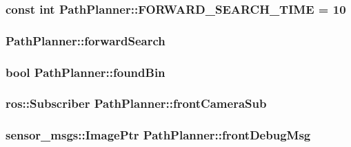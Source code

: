 \subsubsection[{\texorpdfstring{F\+O\+R\+W\+A\+R\+D\+\_\+\+S\+E\+A\+R\+C\+H\+\_\+\+T\+I\+ME}{FORWARD_SEARCH_TIME}}]{\setlength{\rightskip}{0pt plus 5cm}const int Path\+Planner\+::\+F\+O\+R\+W\+A\+R\+D\+\_\+\+S\+E\+A\+R\+C\+H\+\_\+\+T\+I\+ME = 10}\hypertarget{classPathPlanner_a12b219c458ee64a02f3255f76ad63be6}{}\label{classPathPlanner_a12b219c458ee64a02f3255f76ad63be6}
\subsubsection[{\texorpdfstring{forward\+Search}{forwardSearch}}]{ Path\+Planner\+::forward\+Search}\hypertarget{classPathPlanner_a2164113fa9ab422003bffad0454f5bb0}{}\label{classPathPlanner_a2164113fa9ab422003bffad0454f5bb0}
\subsubsection[{\texorpdfstring{found\+Bin}{foundBin}}]{\setlength{\rightskip}{0pt plus 5cm}bool Path\+Planner\+::found\+Bin}\hypertarget{classPathPlanner_ac649564f82726f564a0e4b1446886c5d}{}\label{classPathPlanner_ac649564f82726f564a0e4b1446886c5d}
\subsubsection[{\texorpdfstring{front\+Camera\+Sub}{frontCameraSub}}]{\setlength{\rightskip}{0pt plus 5cm}ros\+::\+Subscriber Path\+Planner\+::front\+Camera\+Sub}\hypertarget{classPathPlanner_ae5bf7f525a1723eef45c2887e8b3fbae}{}\label{classPathPlanner_ae5bf7f525a1723eef45c2887e8b3fbae}
\subsubsection[{\texorpdfstring{front\+Debug\+Msg}{frontDebugMsg}}]{\setlength{\rightskip}{0pt plus 5cm}sensor\+\_\+msgs\+::\+Image\+Ptr Path\+Planner\+::front\+Debug\+Msg}\hypertarget{classPathPlanner_a54f52fe7a3bad416e15f326b807692e2}{}\label{classPathPlanner_a54f52fe7a3bad416e15f326b807692e2}

